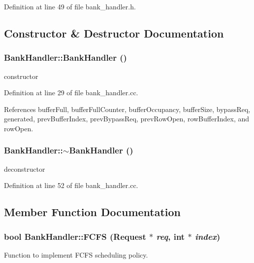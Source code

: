 Definition at line 49 of file bank\_\-handler.h.

\subsection{Constructor \& Destructor Documentation}
\subsubsection[{BankHandler}]{\setlength{\rightskip}{0pt plus 5cm}BankHandler::BankHandler ()}\label{classBankHandler_110a6818b5140e76f81476dc47bbfe1b}


constructor 



Definition at line 29 of file bank\_\-handler.cc.

References bufferFull, bufferFullCounter, bufferOccupancy, bufferSize, bypassReq, generated, prevBufferIndex, prevBypassReq, prevRowOpen, rowBufferIndex, and rowOpen.
\subsubsection[{$\sim$BankHandler}]{\setlength{\rightskip}{0pt plus 5cm}BankHandler::$\sim$BankHandler ()}\label{classBankHandler_80d544db88459320e30adb73147123dd}


deconstructor 



Definition at line 52 of file bank\_\-handler.cc.

\subsection{Member Function Documentation}
\subsubsection[{FCFS}]{\setlength{\rightskip}{0pt plus 5cm}bool BankHandler::FCFS ({\bf Request} $\ast$ {\em req}, \/  int $\ast$ {\em index})}\label{classBankHandler_9fa196596e22b045d4dc68a20f9a9da3}


Function to implement FCFS scheduling policy. 



